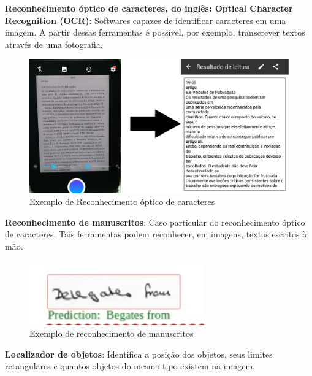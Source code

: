 \documentclass{article}
\begin{document}
\textbf{Reconhecimento óptico de caracteres, do inglês: Optical Character Recognition (OCR)}: Softwares capazes de identificar caracteres em uma imagem. A partir dessas ferramentas é possível, por exemplo, transcrever textos através de uma fotografia.\\
\begin{figure}[H]
    \centering
    \includegraphics[scale=0.15]{imagens/ocr.png}
    \caption{Exemplo de Reconhecimento óptico de caracteres}
    \label{fig:ocr}
\end{figure}{}
\textbf{Reconhecimento de manuscritos}: Caso particular do reconhecimento óptico de caracteres. Tais ferramentas podem reconhecer, em imagens, textos escritos à mão.\\
\begin{figure}[H]
    \centering
    \includegraphics[scale=0.5]{imagens/handwritten.png}
    \caption{Exemplo de reconhecimento de manuscritos}
    \label{fig:manuscrito}
\end{figure}{}
\textbf{Localizador de objetos}: Identifica a posição dos objetos, seus limites retangulares e quantos objetos do mesmo tipo existem na imagem.\\
\end{document}
